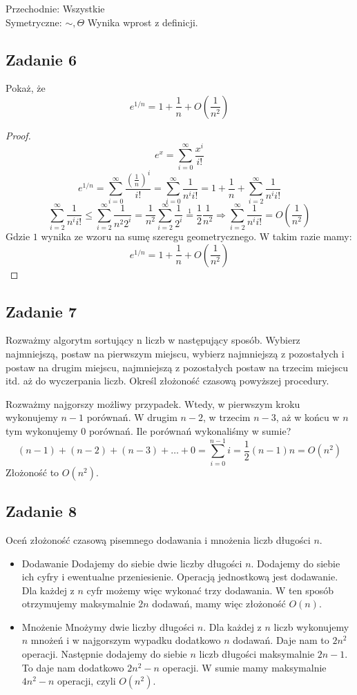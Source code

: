 \documentclass[a4paper]{article}
\begin{document}
Przechodnie: Wszystkie\\
Symetryczne: $\sim, \Theta$
Wynika wprost z definicji.

\clearpage
\subsection*{Zadanie 6}
Pokaż, że
$$e^{1/n} = 1+\frac{1}{n} + O\left(\frac{1}{n^2}\right)$$

\begin{proof}
$$e^{x}=\sum\limits_{i=0}^{\infty} \frac{x^i}{i!} $$
$$e^{1/n}=\sum\limits_{i=0}^{\infty} \frac{(\frac{1}{n})^i}{i!} =\sum\limits_{i=0}^{\infty} \frac{1}{n^i i!} = 1+ \frac{1}{n} + \sum\limits_{i=2}^{\infty} \frac{1}{n^i i!}$$
$$\sum\limits_{i=2}^{\infty} \frac{1}{n^i i!} \leq \sum\limits_{i=2}^{\infty} \frac{1}{n^2 2^i} = \frac{1}{n^2} \sum\limits_{i=2}^{\infty} \frac{1}{ 2^i} \overset{1}{=} \frac{1}{2}\frac{1}{n^2}\Rightarrow \sum\limits_{i=2}^{\infty} \frac{1}{n^i i!} = O\left(\frac{1}{n^2}\right)$$
Gdzie $1$ wynika ze wzoru na sumę szeregu geometrycznego.
W takim razie mamy:
$$e^{1/n}= 1+ \frac{1}{n}+O\left(\frac{1}{n^2}\right)$$
\end{proof}

\subsection*{Zadanie 7}
Rozważmy algorytm sortujący n liczb w następujący sposób. Wybierz najmniejszą, postaw na pierwszym miejscu, wybierz najmniejszą z pozostałych i postaw na drugim miejscu, najmniejszą z pozostałych postaw na trzecim miejscu itd. aż do wyczerpania liczb. Określ złożoność czasową powyższej procedury.

Rozważmy najgorszy możliwy przypadek. Wtedy, w pierwszym kroku wykonujemy $n-1$ porównań. W drugim $n-2$, w trzecim $n-3$, aż w końcu w $n$tym wykonujemy $0$ porównań. Ile porównań wykonaliśmy w sumie?
$$(n-1)+(n-2)+(n-3)+\dots+0=\sum\limits_{i=0}^{n-1} i = \frac{1}{2}(n-1)n = O(n^2)$$
Złożoność to $O(n^2)$.

\subsection*{Zadanie 8}
Oceń złożoność czasową pisemnego dodawania i mnożenia liczb długości $n$.

\begin{itemize}
\item Dodawanie
Dodajemy do siebie dwie liczby długości $n$. Dodajemy do siebie ich cyfry i ewentualne przeniesienie. Operacją jednostkową jest dodawanie. Dla każdej z $n$ cyfr możemy więc wykonać trzy dodawania. W ten sposób otrzymujemy maksymalnie $2n$ dodawań, mamy więc złożoność $O(n)$.

\item Mnożenie
Mnożymy dwie liczby długości $n$. Dla każdej z $n$ liczb wykonujemy $n$ mnożeń i w najgorszym wypadku dodatkowo $n$ dodawań. Daje nam to $2n^2$ operacji. Następnie dodajemy do siebie $n$ liczb długości maksymalnie $2n-1$. To daje nam dodatkowo $2n^2-n$ operacji. W sumie mamy maksymalnie $4n^2-n$ operacji, czyli $O(n^2)$.

  
\end{itemize}
\end{document}
